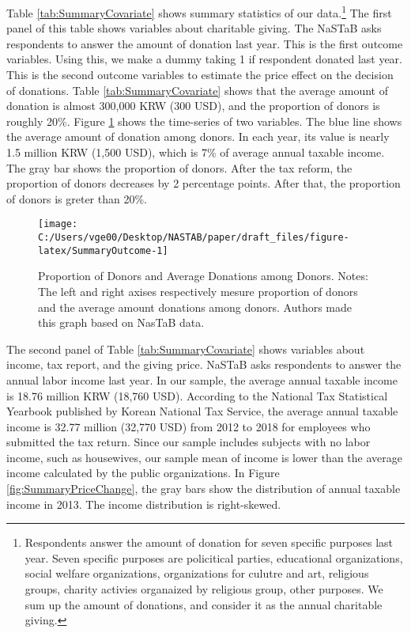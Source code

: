 \documentclass[
  11pt,
  a4paper,
]{article}
\begin{document}
Table \ref{tab:SummaryCovariate} shows summary statistics of our data.\footnote{Respondents answer the amount of donation for seven specific purposes last year. Seven specific purposes are policitical parties, educational organizations, social welfare organizations, organizations for culutre and art, religious groups, charity activies organaized by religious group, other purposes. We sum up the amount of donations, and consider it as the annual charitable giving.}
The first panel of this table shows variables about charitable giving.
The NaSTaB asks respondents to answer the amount of donation last year.
This is the first outcome variables.
Using this, we make a dummy taking 1 if respondent donated last year.
This is the second outcome variables to estimate the price effect on the decision of donations.
Table \ref{tab:SummaryCovariate} shows that
the average amount of donation is almost 300,000 KRW (300 USD),
and the proportion of donors is roughly 20\%.
Figure \ref{fig:SummaryOutcome} shows the time-series of two variables.
The blue line shows the average amount of donation among donors.
In each year, its value is nearly 1.5 million KRW (1,500 USD),
which is 7\% of average annual taxable income.
The gray bar shows the proportion of donors.
After the tax reform, the proportion of donors decreases by 2 percentage points.
After that, the proportion of donors is greter than 20\%.

\begin{figure}[t]

{\centering \texttt{[image: C:/Users/vge00/Desktop/NASTAB/paper/draft\_files/figure-latex/SummaryOutcome-1]} 

}

\caption{Proportion of Donors and Average Donations among Donors. Notes: The left and right axises respectively mesure proportion of donors and the average amount donations among donors. Authors made this graph based on NasTaB data.}\label{fig:SummaryOutcome}
\end{figure}

The second panel of Table \ref{tab:SummaryCovariate} shows variables about income, tax report, and the giving price.
NaSTaB asks respondents to answer the annual labor income last year.
In our sample, the average annual taxable income is 18.76 million KRW (18,760 USD).
According to the National Tax Statistical Yearbook published by Korean National Tax Service,
the average annual taxable income is 32.77 million (32,770 USD) from 2012 to 2018
for employees who submitted the tax return.
Since our sample includes subjects with no labor income, such as housewives,
our sample mean of income is lower than the average income calculated by the public organizations.
In Figure \ref{fig:SummaryPriceChange},
the gray bars show the distribution of annual taxable income in 2013.
The income distribution is right-skewed.
\end{document}

